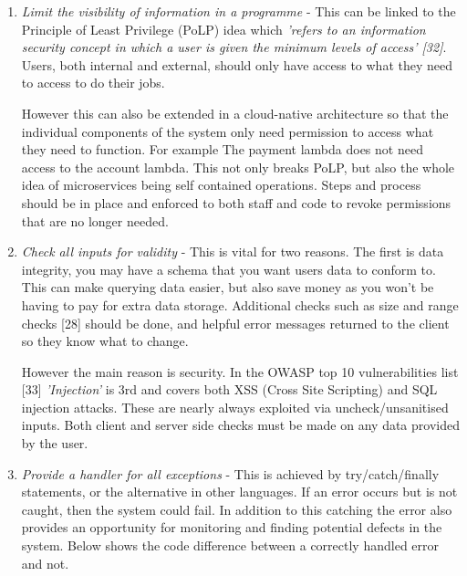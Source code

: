   \begin{enumerate}
    \label{sec:PoLP}
    \item \textit{Limit the visibility of information in a programme} - This can be linked to the Principle of Least Privilege (PoLP) idea which 
    \textit{'refers to an information security concept in which a user is given the minimum levels of access' [32]}. Users, both internal and external, 
    should only have access to what they need to access to do their jobs. 

    However this can also be extended in a cloud-native architecture so that the individual components of the system only need permission to access what 
    they need to function. For example The payment lambda does not need access to the account lambda. This not only breaks PoLP, but also the whole idea of
    microservices being self contained operations. Steps and process should be in place and enforced to both staff and code to revoke permissions that are no
    longer needed.

    \item \textit{Check all inputs for validity} - This is vital for two reasons. The first is data integrity, you may have a schema that you want users
    data to conform to. This can make querying data easier, but also save money as you won't be having to pay for extra data storage. Additional checks such 
    as size and range checks [28] should be done, and helpful error messages returned to the client so they know what to change.
    
    However the main reason is security. In the OWASP top 10 vulnerabilities list [33] \textit{'Injection'} is 3rd and covers both XSS (Cross Site Scripting) 
    and SQL injection attacks. These are nearly always exploited via uncheck/unsanitised inputs. Both client and server side checks must be made on any data
    provided by the user. 

    \item \textit{Provide a handler for all exceptions} - This is achieved by try/catch/finally statements, or the alternative in other languages. If an 
    error occurs but is not caught, then the system could fail. In addition to this catching the error also provides an opportunity for monitoring and 
    finding potential defects in the system. Below shows the code difference between a correctly handled error and not.


\end{enumerate}
